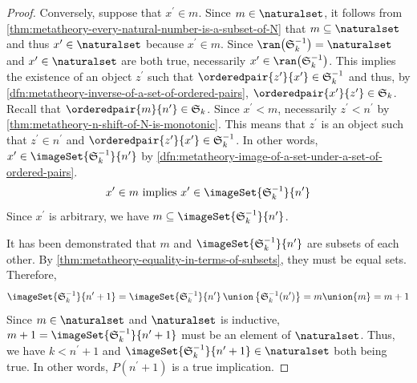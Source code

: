 \begin{proof}
    \vspace{0.3cm}
    \noindent
    Conversely, suppose that \( x^{\prime} \in m \).
    Since \( m \in \naturalset \), it follows from \cref{thm:metatheory-every-natural-number-is-a-subset-of-N} that \( m \subseteq \naturalset \)
    and thus \( x^{\prime} \in \naturalset \) because \( x^{\prime} \in m \).
    Since \( \ran \mleft( \mathfrak{S}^{-1}_{k} \mright) = \naturalset \) and \( x^{\prime} \in \naturalset \) are both true,
    necessarily \( x^{\prime} \in  \ran \mleft( \mathfrak{S}^{-1}_{k} \mright) \).
    This implies the existence of an object \( z^{\prime} \) such that \( \orderedpair{z^{\prime}}{x^{\prime}} \in \mathfrak{S}^{-1}_{k} \) and
    thus, by \cref{dfn:metatheory-inverse-of-a-set-of-ordered-pairs}, \( \orderedpair{x^{\prime}}{z^{\prime}} \in \mathfrak{S}_{k} \).
    Recall that \( \orderedpair{m}{n^{\prime}} \in \mathfrak{S}_{k} \).
    Since \( x^{\prime} < m \), necessarily \( z^{\prime} < n^{\prime} \) by \cref{thm:metatheory-n-shift-of-N-is-monotonic}.
    This means that \( z^{\prime} \) is an object such that \( z^{\prime} \in n^{\prime} \) and \( \orderedpair{z^{\prime}}{x^{\prime}} \in \mathfrak{S}^{-1}_{k} \).
    In other words, \( x^{\prime} \in \imageSet{\mathfrak{S}^{-1}_{k}}{n^{\prime}} \) by \cref{dfn:metatheory-image-of-a-set-under-a-set-of-ordered-pairs}.
    \begin{equation*}
        x^{\prime} \in m \ \text{implies} \ x^{\prime} \in \imageSet{\mathfrak{S}^{-1}_{k}}{n^{\prime}}
    \end{equation*}
    Since \( x^{\prime} \) is arbitrary, we have \( m \subseteq \imageSet{\mathfrak{S}^{-1}_{k}}{n^{\prime}} \).

    \vspace{0.3cm}
    \noindent
    It has been demonstrated that \( m \) and \( \imageSet{\mathfrak{S}^{-1}_{k}}{n^{\prime}} \) are subsets of each other.
    By \cref{thm:metatheory-equality-in-terms-of-subsets}, they must be equal sets.
    Therefore,
    \begin{equation*}
        \imageSet{\mathfrak{S}^{-1}_{k}}{n^{\prime} + 1}
        = \imageSet{\mathfrak{S}^{-1}_{k}}{n^{\prime}} \,{\union}\, \mleft\{ \mathfrak{S}^{-1}_{k}(n^{\prime}) \mright\}
        = m \union \mleft\{ m \mright\}
        = m + 1
    \end{equation*}
    Since \( m \in \naturalset \) and \( \naturalset \) is inductive, \( m + 1 = \imageSet{\mathfrak{S}^{-1}_{k}}{n^{\prime} + 1} \) must be
    an element of \( \naturalset \).
    Thus, we have \( k < n^{\prime} + 1 \) and \( \imageSet{\mathfrak{S}^{-1}_{k}}{n^{\prime} + 1} \in \naturalset \) both being true.
    In other words, \( P(n^{\prime} + 1) \) is a true implication.


\end{proof}
